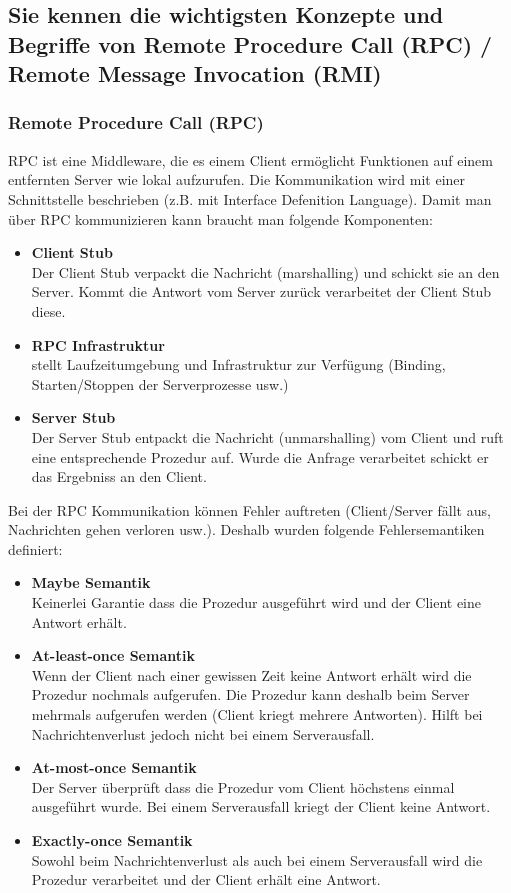 \subsection{Sie kennen die wichtigsten Konzepte und Begriffe von Remote Procedure Call (RPC) / Remote Message Invocation (RMI)}

\subsubsection{Remote Procedure Call (RPC)}

RPC ist eine Middleware, die es einem Client ermöglicht Funktionen auf einem entfernten Server wie lokal aufzurufen. Die Kommunikation wird mit einer Schnittstelle beschrieben (z.B. mit Interface Defenition Language). Damit man über RPC kommunizieren kann braucht man folgende Komponenten:
\begin{itemize}
	\item \textbf{Client Stub} \\
	Der Client Stub verpackt die Nachricht (marshalling) und schickt sie an den Server. Kommt die Antwort vom Server zurück verarbeitet der Client Stub diese.
	\item \textbf{RPC Infrastruktur} \\
	stellt Laufzeitumgebung und Infrastruktur zur Verfügung (Binding, Starten/Stoppen der Serverprozesse usw.)
	\item \textbf{Server Stub} \\
	Der Server Stub entpackt die Nachricht (unmarshalling) vom Client und ruft eine entsprechende Prozedur auf. Wurde die Anfrage verarbeitet schickt er das Ergebniss an den Client.
\end{itemize}  
Bei der RPC Kommunikation können Fehler auftreten (Client/Server fällt aus, Nachrichten gehen verloren usw.). Deshalb wurden folgende Fehlersemantiken definiert:

\begin{itemize}
	\item \textbf{Maybe Semantik} \\
	Keinerlei Garantie dass die Prozedur ausgeführt wird und der Client eine Antwort erhält.
	\item \textbf{At-least-once Semantik} \\
	Wenn der Client nach einer gewissen Zeit keine Antwort erhält wird die Prozedur nochmals aufgerufen. Die Prozedur kann deshalb beim Server mehrmals aufgerufen werden (Client kriegt mehrere Antworten). Hilft bei Nachrichtenverlust jedoch nicht bei einem Serverausfall.
	\item \textbf{At-most-once Semantik} \\
	Der Server überprüft dass die Prozedur vom Client höchstens einmal ausgeführt wurde. Bei einem Serverausfall kriegt der Client keine Antwort.
	\item \textbf{Exactly-once Semantik} \\
	Sowohl beim Nachrichtenverlust als auch bei einem Serverausfall wird die Prozedur verarbeitet und der Client erhält eine Antwort.
\end{itemize}

